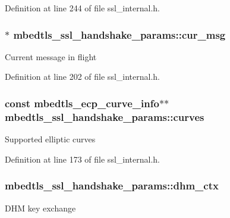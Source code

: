 Definition at line 244 of file ssl\-\_\-internal.\-h.

\hypertarget{structmbedtls__ssl__handshake__params_ac2760d03e7f79984a26cf0c06e816211}{
\subsubsection[{cur\-\_\-msg}]{$\ast$ mbedtls\-\_\-ssl\-\_\-handshake\-\_\-params\-::cur\-\_\-msg}}\label{structmbedtls__ssl__handshake__params_ac2760d03e7f79984a26cf0c06e816211}
Current message in flight 

Definition at line 202 of file ssl\-\_\-internal.\-h.

\hypertarget{structmbedtls__ssl__handshake__params_a521abec631fe5c81cf5c094cc374b8eb}{
\subsubsection[{curves}]{\setlength{\rightskip}{0pt plus 5cm}const {\bf mbedtls\-\_\-ecp\-\_\-curve\-\_\-info}$\ast$$\ast$ mbedtls\-\_\-ssl\-\_\-handshake\-\_\-params\-::curves}}\label{structmbedtls__ssl__handshake__params_a521abec631fe5c81cf5c094cc374b8eb}
Supported elliptic curves 

Definition at line 173 of file ssl\-\_\-internal.\-h.

\hypertarget{structmbedtls__ssl__handshake__params_aaa85609e03e300c910db01e8a321950f}{
\subsubsection[{dhm\-\_\-ctx}]{ mbedtls\-\_\-ssl\-\_\-handshake\-\_\-params\-::dhm\-\_\-ctx}}\label{structmbedtls__ssl__handshake__params_aaa85609e03e300c910db01e8a321950f}
D\-H\-M key exchange 

